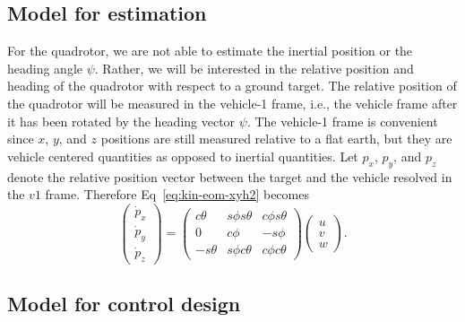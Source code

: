 {\subsection{Model for estimation}
For the quadrotor, we are not able to estimate the inertial position
or the heading angle $\psi$.  Rather, we will be interested in the
relative position and heading of the quadrotor with respect to a
ground target.  The relative position of the quadrotor will be
measured in the vehicle-1 frame, i.e., the vehicle frame after it
has been rotated by the heading vector $\psi$.  The vehicle-1 frame
is convenient since $x$, $y$, and $z$ positions are still measured
relative to a flat earth, but they are vehicle centered quantities
as opposed to inertial quantities.  Let $p_x$, $p_y$, and $p_z$
denote the relative position vector between the target and the
vehicle resolved in the $v1$ frame.  Therefore
Eq~\eqref{eq:kin-eom-xyh2} becomes
\begin{equation}     \label{eq:kin-eom-xyh3}
\begin{pmatrix} \dot{p}_x \\ \dot{p}_y \\ \dot{p}_z \end{pmatrix}
= \begin{pmatrix} c\theta & s\phi s\theta
    & c\phi s\theta \\
    0 &  c\phi
    & - s\phi  \\
    -s\theta & s\phi c\theta & c\phi c\theta
    \end{pmatrix}
    \begin{pmatrix} u \\ v \\ w \end{pmatrix}.
\end{equation}

\subsection{Model for control design}

}
